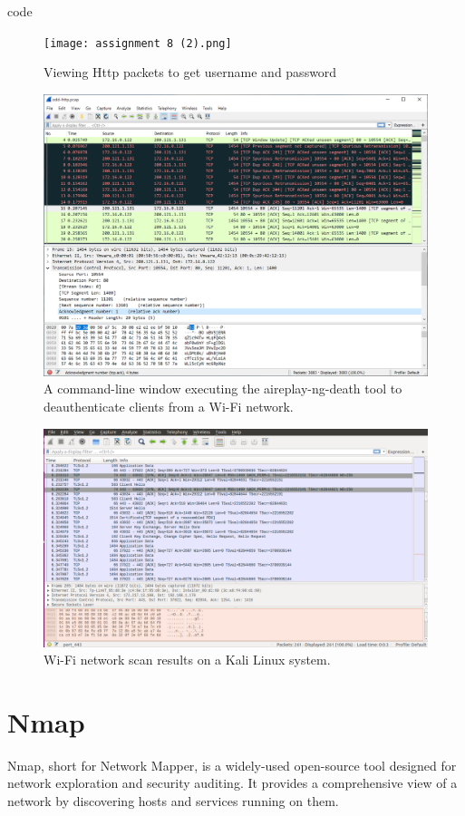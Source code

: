 code \documentclass[11pt]{article}
\begin{document}
\begin{figure}[H]
    \centering
    \texttt{[image: assignment 8 (2).png]}
    \caption{Viewing Http packets to get username and password}
\end{figure}


\begin{figure}[H]
	\centering
	\includegraphics[width=.95\textwidth]{img/wireshark/wireshark_8.jpg}
	\caption{A command-line window executing the aireplay-ng-death tool to deauthenticate clients from a Wi-Fi network. }
\end{figure}

\begin{figure}[H]
	\centering
	\includegraphics[width=.95\textwidth]{img/wireshark/wireshark_9.jpg}
	\caption{Wi-Fi network scan results on a Kali Linux system.	}
\end{figure}

\section{Nmap}
Nmap, short for Network Mapper, is a widely-used open-source tool designed for network exploration and security auditing. It provides a comprehensive view of a network by discovering hosts and services running on them.
\end{document}
